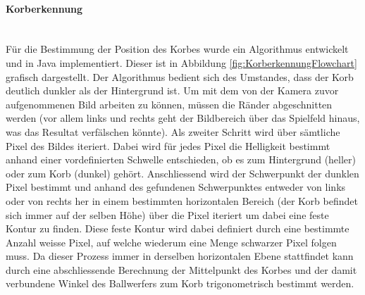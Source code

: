 	\paragraph{Korberkennung}$~~$\vspace{2mm}\\
		Für die Bestimmung der Position des Korbes wurde ein Algorithmus entwickelt und in Java implementiert. Dieser ist in Abbildung \ref{fig:KorberkennungFlowchart} grafisch dargestellt.
		Der Algorithmus bedient sich des Umstandes, dass der Korb deutlich dunkler als der Hintergrund ist. 
		Um mit dem von der Kamera zuvor aufgenommenen Bild arbeiten zu können, müssen die Ränder abgeschnitten werden 
		(vor allem links und rechts geht der Bildbereich über das Spielfeld hinaus, was das Resultat verfälschen könnte). 
		Als zweiter Schritt wird über sämtliche Pixel des Bildes iteriert. Dabei wird für jedes Pixel die Helligkeit bestimmt 
		anhand einer vordefinierten Schwelle entschieden, ob es zum Hintergrund (heller) oder zum Korb (dunkel) gehört. 
		Anschliessend wird der Schwerpunkt der dunklen Pixel bestimmt und anhand des gefundenen Schwerpunktes entweder
		von links oder von rechts her in einem bestimmten horizontalen Bereich (der Korb befindet sich immer auf der selben Höhe)
		über die Pixel iteriert um dabei eine feste Kontur zu finden. Diese feste Kontur wird dabei definiert durch eine
		bestimmte Anzahl weisse Pixel, auf welche wiederum eine Menge schwarzer Pixel folgen muss. 
		Da dieser Prozess immer in derselben horizontalen Ebene stattfindet kann durch eine abschliessende Berechnung 
		der Mittelpunkt des Korbes und der damit verbundene Winkel des Ballwerfers zum Korb trigonometrisch bestimmt werden.
